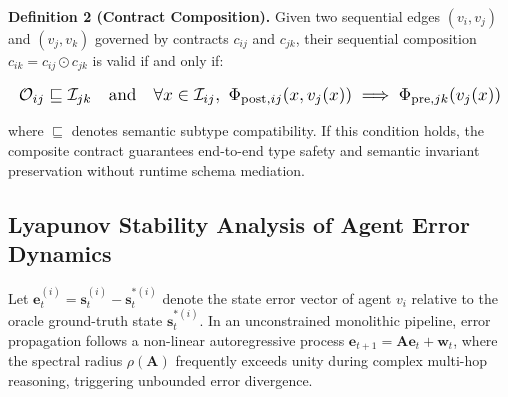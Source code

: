 \documentclass[10pt,journal,compsoc,twocolumn]{IEEEtran}
\begin{document}
\textbf{Definition 2 (Contract Composition).} Given two sequential edges $(v_i, v_j)$ and $(v_j, v_k)$ governed by contracts $c_{ij}$ and $c_{jk}$, their sequential composition $c_{ik} = c_{ij} \odot c_{jk}$ is valid if and only if:

























\begin{equation}
\resizebox{\columnwidth}{!}{$\displaystyle
\begin{aligned}
\mathcal{O}_{ij} \sqsubseteq \mathcal{I}_{jk} \quad \text{and} \quad \forall x \in \mathcal{I}_{ij},\ \Phi_{\text{post}, ij}(x, v_j(x)) \implies \Phi_{\text{pre}, jk}(v_j(x))
\end{aligned}
$}
\end{equation}

























where $\sqsubseteq$ denotes semantic subtype compatibility. If this condition holds, the composite contract guarantees end-to-end type safety and semantic invariant preservation without runtime schema mediation.


\subsection{Lyapunov Stability Analysis of Agent Error Dynamics}


Let $\mathbf{e}_t^{(i)} = \mathbf{s}_t^{(i)} - \mathbf{s}_t^{*(i)}$ denote the state error vector of agent $v_i$ relative to the oracle ground-truth state $\mathbf{s}_t^{*(i)}$. In an unconstrained monolithic pipeline, error propagation follows a non-linear autoregressive process $\mathbf{e}_{t+1} = \mathbf{A}\mathbf{e}_t + \mathbf{w}_t$, where the spectral radius $\rho(\mathbf{A})$ frequently exceeds unity during complex multi-hop reasoning, triggering unbounded error divergence.
\end{document}
